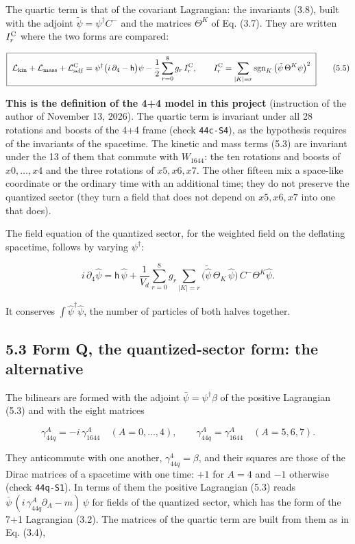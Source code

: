 \documentclass[
  10pt,
]{article}
\begin{document}
The quartic term is that of the covariant Lagrangian: the invariants
(3.8), built with the adjoint \(\tilde\psi=\psi^\dagger C^-\) and the
matrices \(\Theta^K\) of Eq. (3.7). They are written \(I_r^{\rm C}\)
where the two forms are compared:

\[\boxed{\ \mathcal L_{\rm kin}+\mathcal L_{\rm mass}+\mathcal L_{\rm self}^{\rm C}
=\psi^\dagger\big(i\,\partial_4-\mathsf h\big)\psi-\frac12\sum_{r=0}^{8}g_r\,I_r^{\rm C},\qquad
I_r^{\rm C}=\sum_{|K|=r}\mathrm{sgn}_K\,\big(\tilde\psi\,\Theta^K\psi\big)^2\ }\tag{5.5}\]

\textbf{This is the definition of the 4+4 model in this project}
(instruction of the author of November 13, 2026). The quartic term is
invariant under all 28 rotations and boosts of the 4+4 frame (check
\texttt{44c-S4}), as the hypothesis requires of the invariants of the
spacetime. The kinetic and mass terms (5.3) are invariant under the 13
of them that commute with \(W_{1644}\): the ten rotations and boosts of
\(x0,\dots,x4\) and the three rotations of \(x5,x6,x7\). The other
fifteen mix a space-like coordinate or the ordinary time with an
additional time; they do not preserve the quantized sector (they turn a
field that does not depend on \(x5,x6,x7\) into one that does).

The field equation of the quantized sector, for the weighted field on
the deflating spacetime, follows by varying \(\psi^\dagger\):

\[i\,\partial_4\hat\psi=\mathsf h\,\hat\psi+\frac1{V_d}\sum_{r=0}^{8}g_r\sum_{|K|=r}\big(\tilde{\hat\psi}\,\Theta_K\,\hat\psi\big)\,C^-\Theta^K\hat\psi.\tag{5.6}\]

It conserves \(\int\hat\psi^\dagger\hat\psi\), the number of particles
of both halves together.

\hypertarget{form-q-the-quantized-sector-form-the-alternative}{%
\subsection{5.3 Form Q, the quantized-sector form: the
alternative}\label{form-q-the-quantized-sector-form-the-alternative}}

The bilinears are formed with the adjoint \(\bar\psi=\psi^\dagger\beta\)
of the positive Lagrangian (5.3) and with the eight matrices

\[\gamma_{44q}^A=-i\,\gamma_{1644}^A\quad(A=0,\dots,4),\qquad
\gamma_{44q}^A=\gamma_{1644}^A\quad(A=5,6,7).\tag{5.7}\]

They anticommute with one another, \(\gamma_{44q}^4=\beta\), and their
squares are those of the Dirac matrices of a spacetime with one time:
\(+1\) for \(A=4\) and \(-1\) otherwise (check \texttt{44q-S1}). In
terms of them the positive Lagrangian (5.3) reads
\(\bar\psi\,(i\,\gamma_{44q}^A\partial_A-m)\,\psi\) for fields of the
quantized sector, which has the form of the 7+1 Lagrangian (3.2). The
matrices of the quartic term are built from them as in Eq. (3.4),
\end{document}
